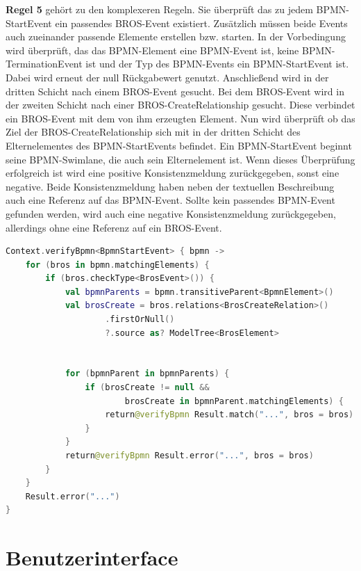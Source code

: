 \textbf{Regel 5} gehört zu den komplexeren Regeln.
Sie überprüft das zu jedem BPMN-StartEvent ein passendes BROS-Event existiert.
Zusätzlich müssen beide Events auch zueinander passende Elemente erstellen bzw. starten.
In der Vorbedingung wird überprüft, das das BPMN-Element eine BPMN-Event ist, keine BPMN-TerminationEvent ist und der Typ des BPMN-Events ein BPMN-StartEvent ist.
Dabei wird erneut der null Rückgabewert genutzt.
Anschließend wird in der dritten Schicht nach einem BROS-Event gesucht.
Bei dem BROS-Event wird in der zweiten Schicht nach einer BROS-CreateRelationship gesucht.
Diese verbindet ein BROS-Event mit dem von ihm erzeugten Element.
Nun wird überprüft ob das Ziel der BROS-CreateRelationship sich mit in der dritten Schicht des Elternelementes des BPMN-StartEvents befindet.
Ein BPMN-StartEvent beginnt seine BPMN-Swimlane, die auch sein Elternelement ist.
Wenn dieses Überprüfung erfolgreich ist wird eine positive Konsistenzmeldung zurückgegeben, sonst eine negative.
Beide Konsistenzmeldung haben neben der textuellen Beschreibung auch eine Referenz auf das BPMN-Event.
Sollte kein passendes BPMN-Event gefunden werden, wird auch eine negative Konsistenzmeldung zurückgegeben, allerdings ohne eine Referenz auf ein BROS-Event.

\begin{lstlisting}[language=Kotlin, caption=Implementierung von Regel 5, label=lst:implementation_rule_5]
Context.verifyBpmn<BpmnStartEvent> { bpmn ->
    for (bros in bpmn.matchingElements) {
        if (bros.checkType<BrosEvent>()) {
            val bpmnParents = bpmn.transitiveParent<BpmnElement>()
            val brosCreate = bros.relations<BrosCreateRelation>()
                    .firstOrNull()
                    ?.source as? ModelTree<BrosElement>


            for (bpmnParent in bpmnParents) {
                if (brosCreate != null && 
                        brosCreate in bpmnParent.matchingElements) {
                    return@verifyBpmn Result.match("...", bros = bros)
                }
            }
            return@verifyBpmn Result.error("...", bros = bros)
        }
    }
    Result.error("...")
}
\end{lstlisting}

\section{Benutzerinterface}

